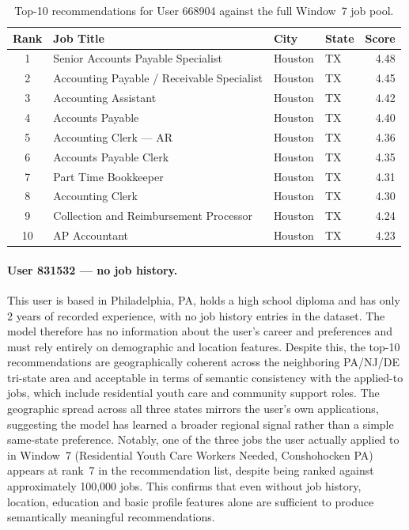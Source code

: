 \begin{table}[H]
    \centering
    \caption{Top-10 recommendations for User 668904 against the full Window~7 job pool.}
    \label{tab:user668904_recs}
    \small
    \begin{tabular}{clll r}
        \toprule
        \textbf{Rank} & \textbf{Job Title} & \textbf{City} & \textbf{State} & \textbf{Score} \\
        \midrule
        1  & Senior Accounts Payable Specialist       & Houston & TX & 4.48 \\
        2  & Accounting Payable / Receivable Specialist & Houston & TX & 4.45 \\
        3  & Accounting Assistant                     & Houston & TX & 4.42 \\
        4  & Accounts Payable                         & Houston & TX & 4.40 \\
        5  & Accounting Clerk — AR                    & Houston & TX & 4.36 \\
        6  & Accounts Payable Clerk                   & Houston & TX & 4.35 \\
        7  & Part Time Bookkeeper                     & Houston & TX & 4.31 \\
        8  & Accounting Clerk                         & Houston & TX & 4.30 \\
        9  & Collection and Reimbursement Processor   & Houston & TX & 4.24 \\
        10 & AP Accountant                            & Houston & TX & 4.23 \\
        \bottomrule
    \end{tabular}
\end{table}

\paragraph{User 831532 — no job history.}
This user is based in Philadelphia, PA, holds a high school diploma 
and has only 2 years of recorded experience, with no job history 
entries in the dataset. The model therefore has no information about 
the user's career and preferences and must rely entirely on demographic 
and location features. Despite this, the top-10 recommendations are 
geographically coherent across the neighboring PA/NJ/DE tri-state area 
and acceptable in terms of semantic consistency with the applied-to 
jobs, which include residential youth care and community support roles. 
The geographic spread across all three states mirrors the user's own 
applications, suggesting the model has learned a broader regional 
signal rather than a simple same-state preference. Notably, one of the 
three jobs the user actually applied to in Window~7 (Residential Youth 
Care Workers Needed, Conshohocken PA) appears at rank~7 in the 
recommendation list, despite being ranked against approximately 100,000 
jobs. This confirms that even without job history, location, education 
and basic profile features alone are sufficient to produce semantically meaningful recommendations.
 
